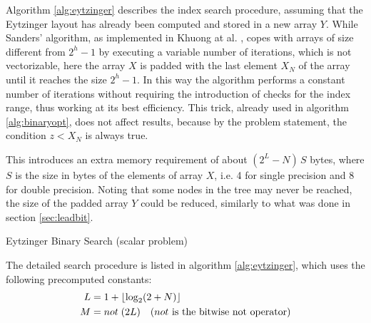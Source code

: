 \documentclass[preprint,1p,times]{elsarticle}
\begin{document}
Algorithm \ref{alg:eytzinger} describes the index search procedure, assuming that the Eytzinger layout has already been computed and stored in a new array $Y$. 
While Sanders' algorithm, as implemented in Khuong at al. \cite{Morin2015}, copes with arrays of size different from $2^h-1$ by executing a variable number of iterations, which is not vectorizable, here the array $X$ is padded with the last element $X_N$ of the array until it reaches the size $2^h-1$. In this way the algorithm performs a constant number of iterations without requiring the introduction of checks for the index range, thus working at its best efficiency. This trick, already used in algorithm \ref{alg:binaryopt}, does not affect results, because by the problem statement, the condition $z<X_N$ is always true.

This introduces an extra memory requirement of about $(2^L-N)\,S$ bytes, where $S$ is the size in bytes of the elements of array $X$, i.e. 4 for single precision and 8 for double precision. Noting that some nodes in the tree may never be reached, the size of the padded array $Y$ could be reduced, similarly to what was done in section \ref{sec:leadbit}.

\begin{algorithm}[ht]
	\caption{Eytzinger Binary Search (scalar problem)}
	\label{alg:eytzinger}
	\begin{algorithmic}
		  
		\EndIf
		  
		\EndIf
		\EndWhile
		
		 
		
		\EndFunction
	\end{algorithmic}
\end{algorithm}

The detailed search procedure is listed in algorithm \ref{alg:eytzinger}, which uses the following precomputed constants:
\begin{align*}
	L&=1+\left \lfloor \log_2(2+N) \right \rfloor \\
	M&= not \; (2L) \quad (not \text{ is the bitwise not operator})
\end{align*}
\end{document}
